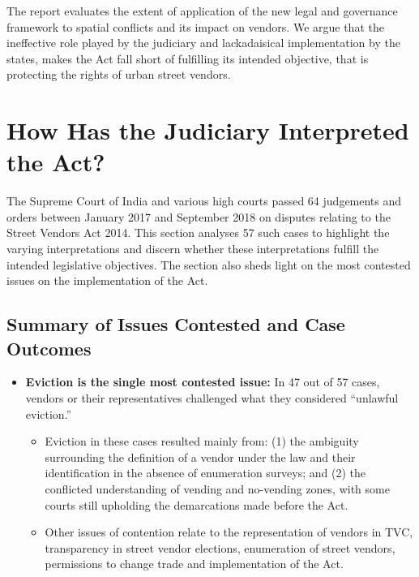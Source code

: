 \documentclass[a4paper, 12pt, twoside]{article}
\begin{document}
{The report evaluates the extent of application of the new legal and governance framework to spatial conflicts and its impact on vendors. We argue that the ineffective role played by the judiciary and lackadaisical implementation by the states, makes the Act fall short of fulfilling its intended objective, that is protecting the rights of urban street vendors.

\section*{How Has the Judiciary Interpreted the Act?}

The Supreme Court of India and various high courts passed 64 judgements and orders between January 2017 and September 2018 on disputes relating to the Street Vendors Act 2014. This section analyses 57 such cases  to highlight the varying interpretations and discern whether these interpretations fulfill the intended legislative objectives. The section also sheds light on the most contested issues on the implementation of the Act.

\subsection*{Summary of Issues Contested and Case Outcomes}

\begin{itemize}
\item \textbf{Eviction is the single most contested issue:} In 47 out of 57 cases, vendors or their representatives challenged what they considered “unlawful eviction.”

\begin{itemize}
\item 	Eviction in these cases resulted mainly from: (1) the ambiguity surrounding the definition of a vendor under the law and their identification in the absence of enumeration surveys; and (2) the conflicted understanding of vending and no-vending zones, with some courts still upholding the demarcations made before the Act.

\item 	Other issues of contention relate to the representation of vendors in TVC, transparency in street vendor elections, enumeration of street vendors, permissions to change trade and implementation of the Act.


\end{itemize}
\end{itemize}}
\end{document}
